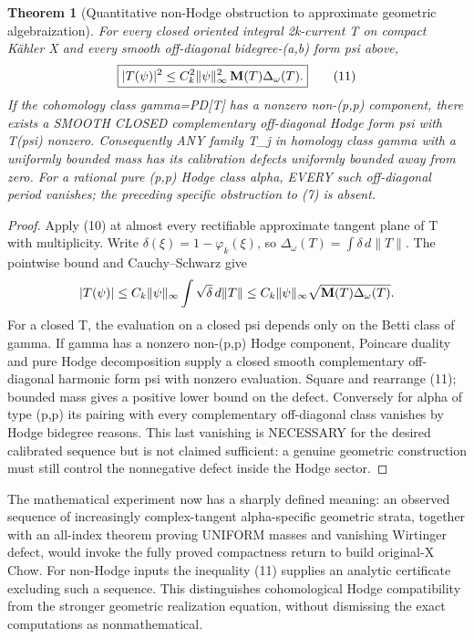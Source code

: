 \documentclass[11pt]{article}
\newtheorem{theorem}{Theorem}
\begin{document}
\begin{theorem}[Quantitative non-Hodge obstruction to approximate geometric algebraization]
For every closed oriented integral
2k-current T on compact Kähler X
and every smooth off-diagonal
bidegree-(a,b) form psi above,
\[
 \boxed{
 |T(\psi)|^2\le
 C_k^2\|\psi\|_\infty^2\,
     {\bf M}(T)\Delta_\omega(T).
 }                                                       \tag{11}
\]
If the cohomology class gamma=PD[T]
has a nonzero non-(p,p) component,
there exists a SMOOTH CLOSED
complementary off-diagonal Hodge
form psi with T(psi) nonzero.
Consequently ANY family T_j
in homology class gamma
with a uniformly bounded mass
has its calibration defects
uniformly bounded away from zero.
For a rational pure (p,p)
Hodge class alpha, EVERY such
off-diagonal period vanishes;
the preceding specific
obstruction to (7) is absent.
\end{theorem}
\begin{proof}
Apply (10) at almost every
rectifiable approximate tangent
plane of T with multiplicity.
Write $\delta(\xi)=
1-\varphi_k(\xi)$, so
$\Delta_\omega(T)=
\int\delta\,d\|T\|$.
The pointwise bound and
Cauchy--Schwarz give
\[
 |T(\psi)|
 \le C_k\|\psi\|_\infty
      \int\sqrt{\delta}\,d\|T\|
 \le C_k\|\psi\|_\infty
        \sqrt{{\bf M}(T)\Delta_\omega(T)} .
\]
For a closed T, the evaluation
on a closed psi depends only
on the Betti class of gamma.
If gamma has a nonzero
non-(p,p) Hodge component,
Poincare duality and pure
Hodge decomposition supply
a closed smooth complementary
off-diagonal harmonic form psi
with nonzero evaluation.
Square and rearrange (11);
bounded mass gives a positive
lower bound on the defect.
Conversely for alpha of
type (p,p) its pairing with
every complementary
off-diagonal class vanishes
by Hodge bidegree reasons.
This last vanishing is
NECESSARY for the desired
calibrated sequence but
is not claimed sufficient:
a genuine geometric
construction must still
control the nonnegative
defect inside the Hodge
sector.
\end{proof}

The mathematical experiment
now has a sharply defined
meaning: an observed
sequence of increasingly
complex-tangent alpha-specific
geometric strata, together
with an all-index theorem
proving UNIFORM masses and
vanishing Wirtinger defect,
would invoke the fully
proved compactness return
to build original-X Chow.
For non-Hodge inputs
the inequality (11)
supplies an analytic
certificate excluding
such a sequence.
This distinguishes
cohomological
Hodge compatibility from
the stronger geometric
realization equation,
without dismissing the
exact computations as
nonmathematical.
\end{document}
